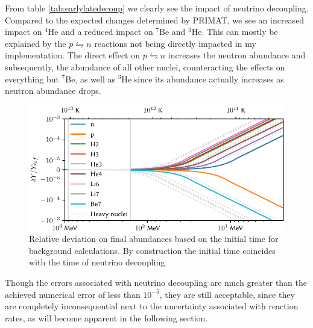 From table \ref{tab:earlylatedecoup} we clearly see the impact of neutrino decoupling. Compared to the expected changes determined by PRIMAT\cite{PRIMAT}, we see an increased impact on ${}^4$He and a reduced impact on ${}^7$Be and ${}^3$He. This can mostly be explained by the $p\leftrightharpoons n$ reactions not being directly impacted in my implementation. The direct effect on $p\leftrightharpoons n$ increases the neutron abundance and subsequently, the abundance of all other nuclei, counteracting the effects on everything but ${}^7$Be, as well as ${}^3$He since its abundance actually increases as neutron abundance drops.%
\begin{figure}[ht]
    \includegraphics[width=5.1in]{figures/initime.pdf}
    \caption{Relative deviation on final abundances based on the initial time for background calculations. By construction the initial time coincides with the time of neutrino decoupling}
    \label{fig:initime}
\end{figure}

Though the errors associated with neutrino decoupling are much greater than the achieved numerical error of less than $10^{-5}$, they are still acceptable, since they are completely inconsequential next to the uncertainty associated with reaction rates, as will become apparent in the following section.


